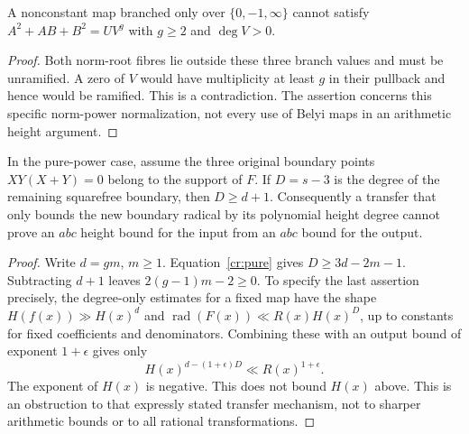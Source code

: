 \begin{corollary}
\label{cr:belyi}
A nonconstant map branched only over $\{0,-1,\infty\}$ cannot satisfy
$A^2+AB+B^2=U V^g$ with $g\ge2$ and $\deg V>0$.
\end{corollary}
\begin{proof}
Both norm-root fibres lie outside these three branch values and must be
unramified. A zero of $V$ would have multiplicity at least $g$ in their
pullback and hence would be ramified. This is a contradiction. The assertion
concerns this specific norm-power normalization, not every use of Belyi maps
in an arithmetic height argument.
\end{proof}

\begin{corollary}\label{cr:degree-barrier}
In the pure-power case, assume the three original boundary points
$XY(X+Y)=0$ belong to the support of $F$. If $D=s-3$ is the degree of the
remaining squarefree boundary, then $D\ge d+1$.
Consequently a transfer that only bounds the new boundary radical by its
polynomial height degree cannot prove an $abc$ height bound for the input
from an $abc$ bound for the output.
\end{corollary}
\begin{proof}
Write $d=gm$, $m\ge1$. Equation~\eqref{cr:pure} gives
$D\ge3d-2m-1$. Subtracting $d+1$ leaves
$2(g-1)m-2\ge0$.
To specify the last assertion precisely, the degree-only estimates for a
fixed map have the shape $H(f(x))\gg H(x)^d$ and
$\operatorname{rad}(F(x))\ll R(x)H(x)^D$, up to constants for fixed
coefficients and denominators. Combining these with an output bound of
exponent $1+\epsilon$ gives only
\[
 H(x)^{d-(1+\epsilon)D}\ll R(x)^{1+\epsilon}.
\]
The exponent of $H(x)$ is negative. This does not bound $H(x)$ above.
This is an obstruction to that expressly stated transfer mechanism, not to
sharper arithmetic bounds or to all rational transformations.
\end{proof}


